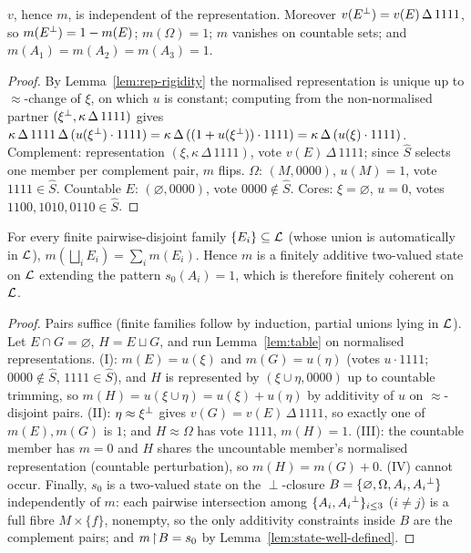 \begin{lemma}\label{lem:state-well-defined}
$v$, hence $m$, is independent of the representation. Moreover
$v(E{}^{\perp})=v(E)\,\Delta\,1111$, so $m(E{}^{\perp})=1-m(E)$; $m(\Omega)=1$; $m$
vanishes on countable sets; and $m(A_1)=m(A_2)=m(A_3)=1$.
\end{lemma}

\begin{proof}
By Lemma~\ref{lem:rep-rigidity} the normalised representation is unique up to
$\approx$-change of $\xi$, on which $u$ is constant; computing from the
non-normalised partner $(\xi{}^{\perp},\kappa\,\Delta\,1111)$ gives
$\kappa\,\Delta\,1111\,\Delta\,(u(\xi{}^{\perp})\cdot 1111)
= \kappa\,\Delta\,((1+u(\xi{}^{\perp}))\cdot 1111)
= \kappa\,\Delta\,(u(\xi)\cdot 1111)$. Complement: representation
$(\xi,\kappa\,\Delta\,1111)$, vote $v(E)\,\Delta\,1111$; since $\hat S$ selects
one member per complement pair, $m$ flips. $\Omega$: $(M,0000)$, $u(M)=1$, vote
$1111\in\hat S$. Countable $E$: $(\varnothing,0000)$, vote $0000\notin\hat S$.
Cores: $\xi=\varnothing$, $u=0$, votes $1100,1010,0110\in\hat S$.
\end{proof}

\begin{theorem}\label{thm:state}
For every finite pairwise-disjoint family $\{E_i\}\subseteq\mathcal{L}$ (whose union is
automatically in $\mathcal{L}$), $m(\bigsqcup_i E_i)=\sum_i m(E_i)$. Hence $m$ is a
finitely additive two-valued state on $\mathcal{L}$ extending the pattern
$s_0(A_i)=1$, which is therefore finitely coherent on $\mathcal{L}$.
\end{theorem}

\begin{proof}
Pairs suffice (finite families follow by induction, partial unions lying in
$\mathcal{L}$). Let $E\cap G=\varnothing$, $H=E\sqcup G$, and run Lemma~\ref{lem:table}
on normalised representations. (I): $m(E)=u(\xi)$ and $m(G)=u(\eta)$ (votes
$u\cdot 1111$; $0000\notin\hat S$, $1111\in\hat S$), and $H$ is represented by
$(\xi\cup\eta,0000)$ up to countable trimming, so
$m(H)=u(\xi\cup\eta)=u(\xi)+u(\eta)$ by additivity of $u$ on
$\approx$-disjoint pairs. (II): $\eta\approx\xi{}^{\perp}$ gives
$v(G)=v(E)\,\Delta\,1111$, so exactly one of $m(E),m(G)$ is $1$; and
$H\approx\Omega$ has vote $1111$, $m(H)=1$. (III): the countable member has
$m=0$ and $H$ shares the uncountable member's normalised representation
(countable perturbation), so $m(H)=m(G)+0$. (IV) cannot occur. Finally, $s_0$ is
a two-valued state on the $\perp$-closure
$B=\{\varnothing,\Omega,A_i,A_i{}^{\perp}\}$ independently of $m$: each pairwise
intersection among $\{A_i,A_i{}^{\perp}\}_{i\le 3}$ ($i\neq j$) is a full fibre
$M\times\{f\}$, nonempty, so the only additivity constraints inside $B$ are the
complement pairs; and $m\!\restriction\! B=s_0$ by Lemma~\ref{lem:state-well-defined}.
\end{proof}

